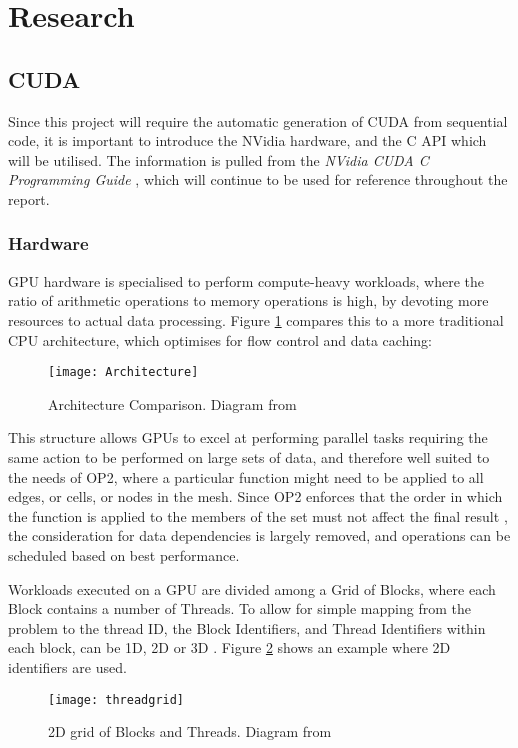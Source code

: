 
\section{Research}
\label{s:research}

\subsection{CUDA}
Since this project will require the automatic generation of CUDA from sequential code, it is important to introduce the NVidia hardware, and the C API which will be utilised. The information is pulled from the \textit{NVidia CUDA C Programming Guide} \cite{guide}, which will continue to be used for reference throughout the report.

\subsubsection{Hardware}
GPU hardware is specialised to perform compute-heavy workloads, where the ratio of arithmetic operations to memory operations is high, by devoting more resources to actual data processing. Figure \ref{fig:arch} compares this to a more traditional CPU architecture, which optimises for flow control and data caching:

\begin{figure}[h]
  \centering
  \texttt{[image: Architecture]}
  \caption{\label{fig:arch} Architecture Comparison. Diagram from \cite[p3]{guide}}
\end{figure}

This structure allows GPUs to excel at performing parallel tasks requiring the same action to be performed on large sets of data, and therefore well suited to the needs of OP2, where a particular function might need to be applied to all edges, or cells, or nodes in the mesh. Since OP2 enforces that the order in which the function is applied to the members of the set must not affect the final result \cite[p4]{manual}, the consideration for data dependencies is largely removed, and operations can be scheduled based on best performance.
\par
Workloads executed on a GPU are divided among a Grid of Blocks, where each Block contains a number of Threads. To allow for simple mapping from the problem to the thread ID, the Block Identifiers, and Thread Identifiers within each block, can be 1D, 2D or 3D \cite[p9]{guide}. Figure \ref{fig:threadgrid} shows an example where 2D identifiers are used.\\
\begin{figure}[h!]
  \centering
  \texttt{[image: threadgrid]}
  \caption{\label{fig:threadgrid} 2D grid of Blocks and Threads. Diagram from \cite[p9]{guide}}
\end{figure}

